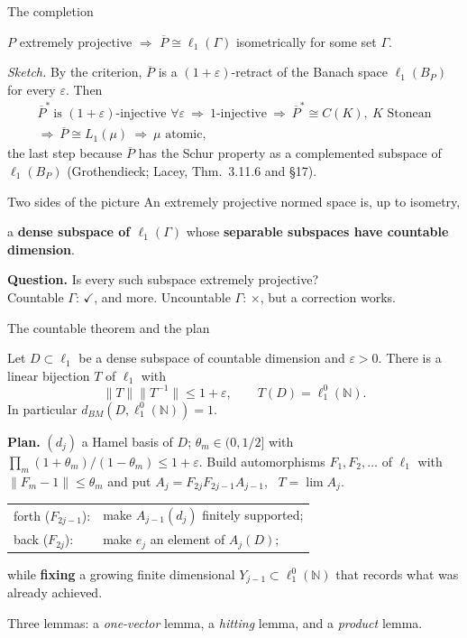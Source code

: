 \documentclass[10pt,aspectratio=169]{beamer}
\newcommand{\lo}[1]{\ell_1^0(#1)}
\newcommand{\ellone}[1]{\ell_1(#1)}
\newcommand{\BM}{d_{BM}}
\newcommand{\NN}{\mathbb N}
\newcommand{\yes}{\textcolor{good}{$\checkmark$}}
\newcommand{\no}{\textcolor{accent}{$\boldsymbol\times$}}
\begin{document}
\begin{frame}{The completion}
  \begin{theorem}[Helemskii 2013; Gr{\o}nb{\ae}k 2016]
    $P$ extremely projective $\Rightarrow$ $\overline P\cong\ellone\Gamma$
    isometrically for some set $\Gamma$.
  \end{theorem}
  \textit{Sketch.} By the criterion, $\overline P$ is a $(1+\varepsilon)$-retract
  of the Banach space $\ellone{B_P}$ for every $\varepsilon$. Then
  \begin{gather*}
    {\overline P}^*\ \text{is $(1+\varepsilon)$-injective }\forall\varepsilon
    \ \Rightarrow\ \text{$1$-injective}
    \ \Rightarrow\ {\overline P}^*\cong C(K),\ K\text{ Stonean}\\
    \Rightarrow\ \overline P\cong L_1(\mu)
    \ \Rightarrow\ \mu\text{ atomic},
  \end{gather*}
  the last step because $\overline P$ has the Schur property as a complemented
  subspace of $\ellone{B_P}$ (Grothendieck; Lacey, Thm.\ 3.11.6 and \S17).

  \begin{block}{Two sides of the picture}
    An extremely projective normed space is, up to isometry,
    \begin{center}
      a \textbf{dense subspace of $\ellone\Gamma$}
      \quad whose \quad
      \textbf{separable subspaces have countable dimension}.
    \end{center}
  \end{block}
  \textbf{Question.} Is every such subspace extremely projective? \\
  Countable $\Gamma$: \yes, and more. \quad Uncountable $\Gamma$: \no, but
  a correction works.
\end{frame}

\begin{frame}{The countable theorem and the plan}
  \begin{theorem}
    Let $D\subset\ell_1$ be a dense subspace of countable dimension and
    $\varepsilon>0$. There is a linear bijection $T$ of $\ell_1$ with
    \[
      \|T\|\|T^{-1}\|\le1+\varepsilon,\qquad T(D)=\lo\NN .
    \]
    In particular $\BM(D,\lo\NN)=1$.
  \end{theorem}
  \textbf{Plan.} $(d_j)$ a Hamel basis of $D$; $\theta_m\in(0,1/2]$ with
  $\prod_m(1+\theta_m)/(1-\theta_m)\le1+\varepsilon$. Build automorphisms
  $F_1,F_2,\dots$ of $\ell_1$ with $\|F_m-1\|\le\theta_m$ and put
  $A_j=F_{2j}F_{2j-1}A_{j-1}$, \ $T=\lim A_j$.
  \medskip

  \begin{tabular}{@{}ll@{}}
    \textcolor{accent}{forth} ($F_{2j-1}$): & make $A_{j-1}(d_j)$ finitely supported;\\[2pt]
    \textcolor{good}{back} ($F_{2j}$): & make $e_j$ an element of $A_j(D)$;
  \end{tabular}
  \medskip

  while \textbf{fixing} a growing finite dimensional $Y_{j-1}\subset\lo\NN$
  that records what was already achieved.
  \medskip

  Three lemmas: a \emph{one-vector} lemma, a \emph{hitting} lemma, and a
  \emph{product} lemma.
\end{frame}
\end{document}
